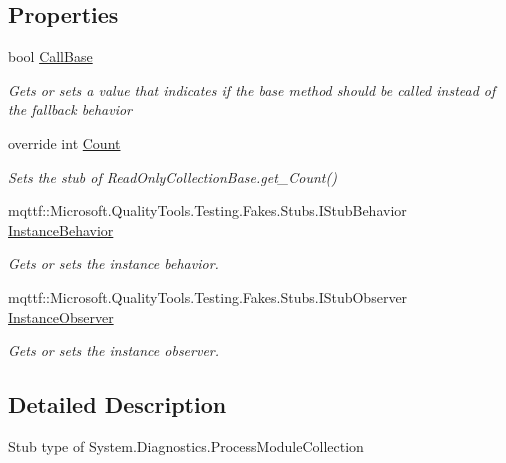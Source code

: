 \subsection*{Properties}
\begin{DoxyCompactItemize}
\item 
bool \hyperlink{class_system_1_1_diagnostics_1_1_fakes_1_1_stub_process_module_collection_afe6d20e7241b3733318fc537825d1b4e}{Call\-Base}
\begin{DoxyCompactList}\small\item\em Gets or sets a value that indicates if the base method should be called instead of the fallback behavior\end{DoxyCompactList}\item 
override int \hyperlink{class_system_1_1_diagnostics_1_1_fakes_1_1_stub_process_module_collection_a282a41467e228e2c34d856164924f9fe}{Count}
\begin{DoxyCompactList}\small\item\em Sets the stub of Read\-Only\-Collection\-Base.\-get\-\_\-\-Count()\end{DoxyCompactList}\item 
mqttf\-::\-Microsoft.\-Quality\-Tools.\-Testing.\-Fakes.\-Stubs.\-I\-Stub\-Behavior \hyperlink{class_system_1_1_diagnostics_1_1_fakes_1_1_stub_process_module_collection_a53f858f96baf2a0b7271885f2ec7478e}{Instance\-Behavior}
\begin{DoxyCompactList}\small\item\em Gets or sets the instance behavior.\end{DoxyCompactList}\item 
mqttf\-::\-Microsoft.\-Quality\-Tools.\-Testing.\-Fakes.\-Stubs.\-I\-Stub\-Observer \hyperlink{class_system_1_1_diagnostics_1_1_fakes_1_1_stub_process_module_collection_a8c812740fa3b06d14937cadf01246c8a}{Instance\-Observer}
\begin{DoxyCompactList}\small\item\em Gets or sets the instance observer.\end{DoxyCompactList}\end{DoxyCompactItemize}


\subsection{Detailed Description}
Stub type of System.\-Diagnostics.\-Process\-Module\-Collection



